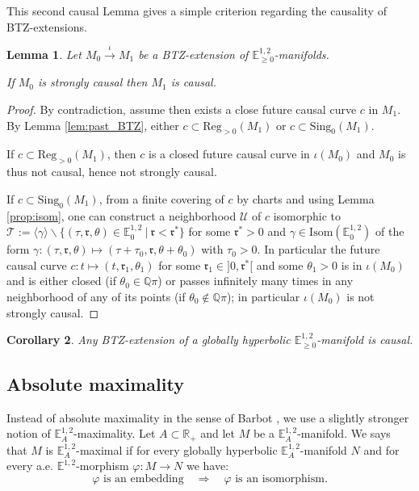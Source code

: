 \documentclass[a4paper,12pt]{article}
\def\r{\mathfrak{r}}
\def\U{\mathcal U}
\def\isom{Isom}
\def\sing{\mathrm{Sing}}
\def\RR{\mathbb{R}}
\newcommand{\mass}[1]{{\mathbb E}^{1,2}_{#1}}
\def\isom{\mathrm{Isom}}
\def\Reg{\mathrm{Reg}}
\def\reg{\Reg}
\newtheorem{lemou}{Lemma}[section]          %
\newtheorem{corou}[lemou]{Corollary}
\begin{document}
This second causal Lemma gives a simple criterion regarding the causality of BTZ-extensions. 
\begin{lemou}\label{btzlem:btz_extension_manifolds_strongly_causal} Let $M_0\xrightarrow{\iota}M_1$ be a BTZ-extension of $\mass{\geq0}$-manifolds.

If $M_0$ is strongly causal then $M_1$ is causal.
\end{lemou}
\begin{proof}
By contradiction, assume then exists a close future causal curve $c$ in $M_1$. By Lemma \ref{lem:past_BTZ}, either $c\subset \reg_{>0}(M_1)$ or $c\subset \sing_0(M_1)$. 

If $c\subset \reg_{>0}(M_1)$, then $c$ is a closed future causal curve in $\iota(M_0)$ and $M_0$ is thus not causal, hence not strongly causal.

If $c\subset \sing_0(M_1)$, from a finite covering of $c$ by charts and using Lemma \ref{prop:isom}, one can construct a neighborhood  $\U$ of $c$ isomorphic to $\mathcal T:=\langle\gamma\rangle \backslash\{(\tau,\r,\theta)\in \mass{0}~|~ \r<\r^*\}$ for some $\r^*>0$ and $\gamma\in \isom(\mass{0})$ of the form $\gamma: (\tau,\r,\theta)\mapsto (\tau+\tau_0,\r,\theta+\theta_0)$ with $\tau_0>0$. 
In particular the future causal curve $c: t \mapsto (t,\r_1,\theta_1)$ for some $\r_1\in ]0,\r^*[$ and some $\theta_1>0$ is in $\iota(M_0)$ and is either closed (if $\theta_0\in \mathbb Q\pi$) or passes infinitely many times in any neighborhood of any of its points (if $\theta_0\not\in \mathbb Q\pi$); in particular $\iota(M_0)$ is not strongly causal.
\end{proof}
\begin{corou}\label{btzcor:GH_causal}\label{cor:GH_causal} Any BTZ-extension of a globally hyperbolic $\mass{\geq0}$-manifold is causal.
\end{corou}

\subsection{Absolute maximality}
\label{sec:Abs_max}

Instead of absolute maximality in the sense of Barbot \cite{barbot_globally_2004}, we use a slightly stronger notion of $\mass{A}$-maximality. Let $A\subset \RR_+$ and let $M$ be a $\mass{A}$-manifold. We says that $M$ is $\mass{A}$-maximal  if for every globally hyperbolic $\mass{A}$-manifold $N$ and for every a.e. $\mass{}$-morphism $\varphi:M\rightarrow N$  we have:
 $$ \varphi \text{~is an embedding} \quad \Rightarrow \quad \varphi \text{~is an isomorphism}. $$
 
\end{document}
